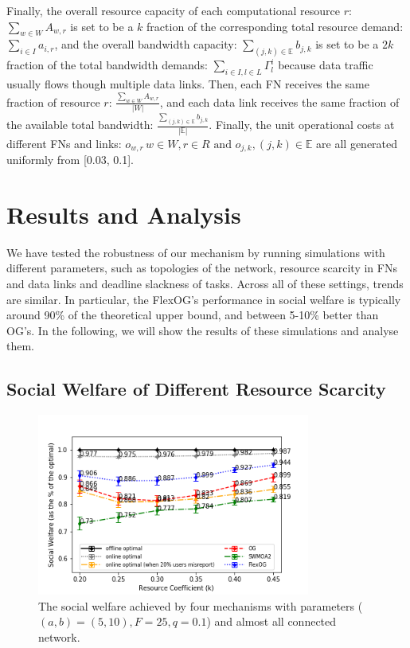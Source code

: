 \documentclass[11pt]{phdthesis}
\begin{document}
Finally, the overall resource capacity of each computational resource $ r $: $\sum_{w \in W} A_{w,r}$ is set to be a $k$ fraction of the corresponding total resource demand: $\sum_{i \in I}a_{i,r}$, and the overall bandwidth capacity: $\sum_{(j, k) \in \mathbb{E}}b_{j, k}$ is set to be a $2k$ fraction of the total bandwidth demands: $\sum_{i\in I, l\in L}\Gamma_l^i$ because data traffic usually flows though multiple data links. Then, each FN receives the same fraction of resource $ r $: $ \frac{\sum_{w \in W} A_{w,r}}{|W|} $, and each data link receives the same fraction of the available total bandwidth: $ \frac{\sum_{(j, k) \in \mathbb{E}}b_{j, k}}{|\mathbb{E}|} $. Finally, the unit operational costs at different FNs and links: $o_{w,r} \, w \in W, r \in R \textrm{ and } o_{j, k}, (j, k) \in \mathbb{E}$ are all generated uniformly from [0.03, 0.1]. 

\section{Results and Analysis} \label{results and analysis}

We have tested the robustness of our mechanism by running simulations with different parameters, such as topologies of the network, resource scarcity in FNs and data links and deadline slackness of tasks. Across all of these settings, trends are similar. In particular, the FlexOG's performance in social welfare is typically around 90\% of the theoretical upper bound, and between 5-10\% better than OG's. In the following, we will show the results of these simulations and analyse them. 

\subsection{Social Welfare of Different Resource Scarcity}

\begin{figure}[h]
    \centering
    \includegraphics[width=0.8\textwidth]{./Figures/comparison of social welfare (resource-coefficient).png}
    \caption{The social welfare achieved by four mechanisms with parameters ($ (a, b) = (5, 10), F = 25, q = 0.1 $) and almost all connected network.}
    \label{fig: social_welfare_resource_coefficient} 
\end{figure}
\end{document}
